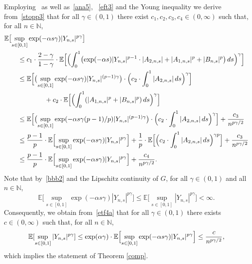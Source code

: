 \documentclass[11pt]{amsart}
\newcommand{\N}{{\mathbb N}}
\newcommand{\EE}{{\mathbb E}}
\theoremstyle{plain}
\theoremstyle{definition}
\begin{document}
Employing~\cite[Lemma 3.2]{gk03b} as well as~\eqref{ana5}, ~\eqref{eft3} and the Young inequality we derive from~\eqref{stopp3} that for all $\gamma\in (0,1)$ there exist $c_1,c_2,c_3, c_4 \in (0,\infty)$ such that, for all $n\in\N$,
\begin{equation}\label{etf4a}
\begin{aligned}
&	\EE\bigl[\sup_{s\in[0,1]}\exp(-\alpha s\gamma) |Y_{n,s}|^{p\gamma} \bigr] \\
& \qquad    \le 	c_1 \cdot\frac{2-\gamma}{1-\gamma}\cdot
 \EE\Bigl[ \Bigl( \int_0^1 \bigl(\exp(-\alpha s) |Y_{n,s}|^{p-1}\cdot  |A_{2,n,s}|+ |A_{1,n,s}|^p+|B_{n,s}|^p\bigr) \, ds \Bigr)^\gamma \Bigr]\\
 & \qquad   \le
 \EE\Bigl[ \bigl( \sup_{s\in[0,1]}\exp(-\alpha s\gamma) |Y_{n,s}|^{(p-1)\gamma}\bigr)\cdot  \Bigl( c_2\cdot \int_0^1   |A_{2,n,s}|\, ds \Bigr)^\gamma\Bigr]\\
 & \qquad\qquad\qquad+c_2\cdot \EE\Bigl[\Bigl( \int_0^1   ( |A_{1,n,s}|^p+|B_{n,s}|^p )\, ds \Bigr)^\gamma \Bigr]\\
  & \qquad  \le
 \EE\Bigl[ \bigl( \sup_{s\in[0,1]}\exp(-\alpha s\gamma (p-1)/p) |Y_{n,s}|^{(p-1)\gamma}\bigr)\cdot \Bigl( c_2\cdot\int_0^1   |A_{2,n,s}|\, ds \Bigr)^\gamma\Bigr] +  \frac{c_3}{n^{p\gamma/2}}\\
  & \qquad   \le
\frac{p-1}{p}\cdot \EE\Bigl[  \sup_{s\in[0,1]}\exp(-\alpha s\gamma) |Y_{n,s}|^{p\gamma}\Bigr]  + \frac{1}{p}\cdot \EE\Bigl[\Bigl( c_2\cdot\int_0^1   |A_{2,n,s}|\, ds \Bigr)^{\gamma p}\Bigr] + \frac{c_3 }{n^{p\gamma/2}}\\
 & \qquad   \le
\frac{p-1}{p}\cdot \EE\Bigl[  \sup_{s\in[0,1]}\exp(-\alpha s\gamma) |Y_{n,s}|^{p\gamma}\Bigr]  + \frac{c_4 }{n^{p\gamma/2}}.	
\end{aligned}
\end{equation}
Note that by~\eqref{bbb2} and the Lipschitz continuity of $G$, for all $\gamma\in(0,1)$ and all $n\in\N$,
\[
\EE\bigl[\sup_{s\in[0,1]}\exp(-\alpha s\gamma) |Y_{n,s}|^{p\gamma} \bigr] \leq \EE\bigl[\sup_{s\in[0,1]} |Y_{n,s}|^{p\gamma} \bigr]<\infty.
\]
Consequently, we obtain from~\eqref{etf4a} that for all $\gamma \in(0,1)$ there exists $c\in (0,\infty)$ such that, for all $n\in\N$,
\[
\EE[\sup_{s\in[0,1]} |Y_{n,s}|^{p\gamma} ]  \le \exp(\alpha\gamma)\cdot  \EE\Bigl[  \sup_{s\in[0,1]}\exp(-\alpha s\gamma) |Y_{n,s}|^{p\gamma}\Bigr] \le   \frac{c}{n^{p\gamma/2}},
\]
which implies the statement of Theorem \ref{comp}.
\end{document}
